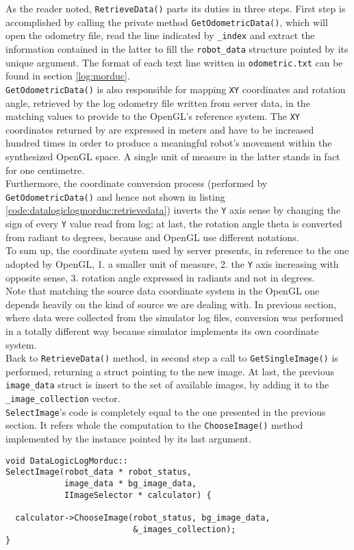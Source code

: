 As the reader noted, \texttt{RetrieveData()} parts its duties in
three steps. First step is accomplished by calling the private method
\texttt{GetOdometricData()}, which will open the odometry file, read
the line indicated by \texttt{\_index} and extract the information
contained in the latter to fill the \texttt{robot\_data} structure
pointed by its unique argument. The format of each text line written in
\texttt{odometric.txt} can be found in section \ref{log:morduc}.
\\
\texttt{GetOdometricData()} is also responsible for mapping \texttt{XY}
coordinates and rotation angle, retrieved by the log
odometry file written from \morduc{} server data, in the matching values
to provide to the OpenGL's reference system. The \texttt{XY} coordinates returned
by \morduc{} are expressed in meters and have to be increased hundred
times in order to produce a meaningful robot's movement within the
synthesized OpenGL space. A single unit of measure in the latter stands
in fact for one centimetre.
\\
Furthermore, the coordinate conversion process (performed by  
\texttt{GetOdometricData()} and hence not shown in listing 
\ref{code:datalogiclogmorduc:retrievedata}) inverts the \texttt{Y} axis sense
by changing the sign of every \texttt{Y} value read from log; at last, the
rotation angle theta is converted from radiant to degrees, because
\morduc{} and OpenGL use different notations.
\\
To sum up, the coordinate system used by \morduc{} server presents,
in reference to the one adopted by OpenGL, 1. a smaller unit of
measure, 2. the \texttt{Y} axis increasing with opposite sense, 3. rotation
angle expressed in radiants and not in degrees.
\\
Note that matching the source data coordinate system in the OpenGL one
depends heavily on the  kind of source we are dealing with. In previous
section, where data were collected from the simulator log files, conversion
was
performed in a totally different way because simulator implements
its own coordinate system.
\\
Back to \texttt{RetrieveData()} method, in second step a call to
\texttt{GetSingleImage()} is performed,
returning a struct pointing to the new image.
At last, the previous \texttt{image\_data} struct is insert to the set
of available images, by adding it to the \texttt{\_image\_collection}
vector.
\\
\texttt{SelectImage}'s code is completely equal to the one
presented in the previous section. It refers whole the computation to the
\texttt{ChooseImage()} method implemented by the instance pointed by
its last argument.
\\
\begin{lstlisting}[caption={\texttt{DataLogicLogMorduc::SelectImage()} method},
    label={code:datalogiclogmorduc:selectimage}]
void DataLogicLogMorduc::
SelectImage(robot_data * robot_status,
            image_data * bg_image_data,
            IImageSelector * calculator) {

  calculator->ChooseImage(robot_status, bg_image_data,
                          &_images_collection);
}

\end{lstlisting}

